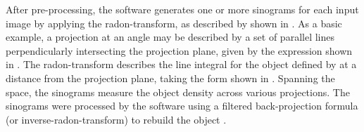 \documentclass[../../../main.tex]{subfiles}
\begin{document}
    After pre-processing, the software generates one or more sinograms for each input image by applying the \gls{radon-transform}, as described by \citeauthor*{book:Kak_2002} shown in .
    As a basic example, a projection at an angle \Xvariable{\theta} may be described by a set of parallel lines  perpendicularly intersecting the projection plane, given by the expression shown in .
    The \gls{radon-transform}  describes the line integral for the object defined by  at a distance  from the projection plane, taking the form shown in .
    Spanning the  space, the sinograms measure the object density across various projections. 
    The sinograms were processed by the software using a filtered back-projection formula (or \gls{inverse-radon-transform}) to rebuild the object \cite{book:Kak_2002,Zakaria_2010}.
\end{document}
